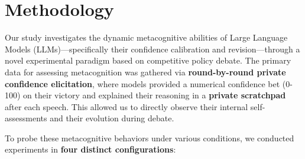 \documentclass{article}
\begin{document}
\section{Methodology}
\label{sec:methodology}

Our study investigates the dynamic metacognitive abilities of Large Language Models (LLMs)—specifically their confidence calibration and revision—through a novel experimental paradigm based on competitive policy debate. The primary data for assessing metacognition was gathered via \textbf{round-by-round private confidence elicitation}, where models provided a numerical confidence bet (0-100) on their victory and explained their reasoning in a \textbf{private scratchpad} after each speech. This allowed us to directly observe their internal self-assessments and their evolution during debate.

To probe these metacognitive behaviors under various conditions, we conducted experiments in \textbf{four distinct configurations}:
\end{document}
